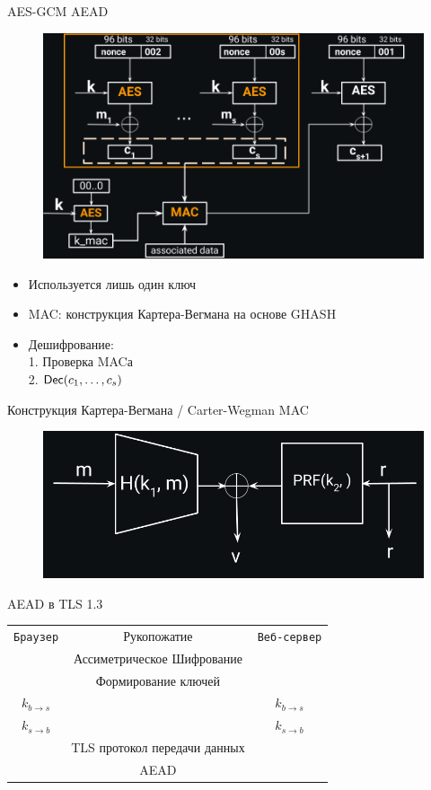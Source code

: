 \documentclass[usenames,dvipsnames,8pt,aspectratio=169]{beamer}
\begin{document}
\begin{frame}{AES-GCM AEAD}
\begin{figure}
	\includegraphics[width=0.65\linewidth]{AES_GCM_AEAD_full}
\end{figure}

\Large
\begin{itemize}
	\item Используется лишь один ключ
	\item MAC: конструкция Картера-Вегмана на основе GHASH
	\item Дешифрование: \\
	1. Проверка MACа \\
	2. $\textsf{Dec}(c_1, \ldots, c_s)$
\end{itemize}

\end{frame}

\begin{frame}{Конструкция Картера-Вегмана / Carter-Wegman MAC }
\vspace{-30pt}
\begin{figure}
	\includegraphics[width=\textwidth]{Carter-Wegman}
\end{figure}
\end{frame}
\begin{frame}{AEAD в TLS 1.3}
	\LARGE
	\begin{center}
		\begin{tabular}{c c c }
			\texttt{Браузер}&  {\color{Orange}{Фаза 1} Рукопожатие}   & \texttt{Веб-сервер}  \\
			& {\Large Ассиметрическое Шифрование}  & \\ 
			& {\Large Формирование ключей}  & \\ 
			$k_{b\rightarrow s}$&  & $k_{b\rightarrow s}$\\ 
			$k_{s\rightarrow b}$&  & $k_{s\rightarrow b}$  \\ [10pt]
			&  {\color{Orange}{Фаза 2} TLS протокол передачи данных}   &  \\
			& {\Large AEAD}  & \\ 
		\end{tabular}
	\end{center}
\end{frame}
\end{document}
